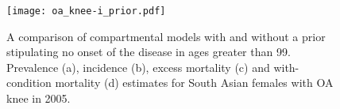     \begin{figure}[h]
        \begin{center}
            \texttt{[image: oa\_knee-i\_prior.pdf]}
            \caption{A comparison of compartmental models with and without a prior stipulating no onset of the disease in ages greater than 99.  Prevalence (a), incidence (b), excess mortality (c) and with-condition mortality (d) estimates for South Asian females with OA knee in 2005.}
            \label{fig:app-oa knee priors}
        \end{center}
    \end{figure} 
